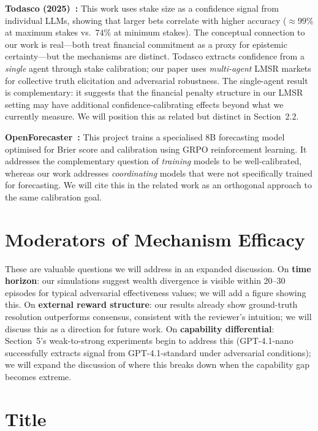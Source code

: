 \documentclass[10pt]{article}
\begin{document}
\textbf{Todasco (2025)~\cite{todasco2025}:} This work uses stake size as a
confidence signal from individual LLMs, showing that larger bets correlate with
higher accuracy ($\approx\!99\%$ at maximum stakes vs.\ $74\%$ at minimum
stakes). The conceptual connection to our work is real---both treat financial
commitment as a proxy for epistemic certainty---but the mechanisms are distinct.
Todasco extracts confidence from a \emph{single} agent through stake calibration;
our paper uses \emph{multi-agent} LMSR markets for collective truth elicitation
and adversarial robustness. The single-agent result is complementary: it suggests
that the financial penalty structure in our LMSR setting may have additional
confidence-calibrating effects beyond what we currently measure. We will position
this as related but distinct in Section~2.2.

\textbf{OpenForecaster~\cite{openforecaster}:} This project trains a
specialised 8B forecasting model optimised for Brier score and calibration using
GRPO reinforcement learning. It addresses the complementary question of
\emph{training} models to be well-calibrated, whereas our work addresses
\emph{coordinating} models that were not specifically trained for forecasting.
We will cite this in the related work as an orthogonal approach to the same
calibration goal.

\section*{Moderators of Mechanism Efficacy}

These are valuable questions we will address in an expanded discussion.
On \textbf{time horizon}: our simulations suggest wealth divergence is visible
within 20--30 episodes for typical adversarial effectiveness values; we will add
a figure showing this. On \textbf{external reward structure}: our results already
show ground-truth resolution outperforms consensus, consistent with the
reviewer's intuition; we will discuss this as a direction for future work. On
\textbf{capability differential}: Section~5's weak-to-strong experiments begin
to address this (GPT-4.1-nano successfully extracts signal from GPT-4.1-standard
under adversarial conditions); we will expand the discussion of where this breaks
down when the capability gap becomes extreme.

\section*{Title}
\end{document}
